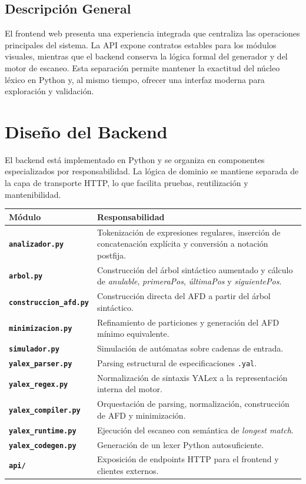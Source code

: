 \documentclass[12pt,a4paper]{article}
\begin{document}
\subsection{Descripción General}

El frontend web presenta una experiencia integrada que centraliza las operaciones principales del sistema. La API expone contratos estables para los módulos visuales, mientras que el backend conserva la lógica formal del generador y del motor de escaneo. Esta separación permite mantener la exactitud del núcleo léxico en Python y, al mismo tiempo, ofrecer una interfaz moderna para exploración y validación.

\section{Diseño del Backend}

El backend está implementado en Python y se organiza en componentes especializados por responsabilidad. La lógica de dominio se mantiene separada de la capa de transporte HTTP, lo que facilita pruebas, reutilización y mantenibilidad.

\begin{longtable}{>{\bfseries\ttfamily\small}p{4cm} p{9.8cm}}
\toprule
\normalfont\textbf{Módulo} & \textbf{Responsabilidad} \\
\midrule
\endhead
\texttt{analizador.py} & Tokenización de expresiones regulares, inserción de concatenación explícita y conversión a notación postfija. \\[6pt]
\texttt{arbol.py} & Construcción del árbol sintáctico aumentado y cálculo de \emph{anulable}, \emph{primeraPos}, \emph{últimaPos} y \emph{siguientePos}. \\[6pt]
\texttt{construccion\_afd.py} & Construcción directa del AFD a partir del árbol sintáctico. \\[6pt]
\texttt{minimizacion.py} & Refinamiento de particiones y generación del AFD mínimo equivalente. \\[6pt]
\texttt{simulador.py} & Simulación de autómatas sobre cadenas de entrada. \\[6pt]
\texttt{yalex\_parser.py} & Parsing estructural de especificaciones \texttt{.yal}. \\[6pt]
\texttt{yalex\_regex.py} & Normalización de sintaxis YALex a la representación interna del motor. \\[6pt]
\texttt{yalex\_compiler.py} & Orquestación de parsing, normalización, construcción de AFD y minimización. \\[6pt]
\texttt{yalex\_runtime.py} & Ejecución del escaneo con semántica de \emph{longest match}. \\[6pt]
\texttt{yalex\_codegen.py} & Generación de un lexer Python autosuficiente. \\[6pt]
\texttt{api/} & Exposición de endpoints HTTP para el frontend y clientes externos. \\
\bottomrule
\end{longtable}
\end{document}
